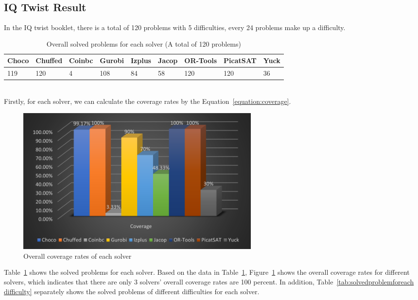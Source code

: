 \subsection{IQ Twist Result}
\label{sec:IQtwistresult}
In the IQ twist booklet, there is a total of 120 problems with 5 difficulties, every 24 problems make up a difficulty. 
\begin{table}[htbp]
\centering
\caption{Overall solved problems for each solver (A total of 120 problems)}
\label{tab:solvedproblem}
\begin{tabular}{|l|l|l|l|l|l|l|l|l|}
\hline
Choco & Chuffed & Coinbc& Gurobi & Izplus&Jacop& OR-Tools& PicatSAT&Yuck \\
\hline
119   &120      & 4     & 108    &84     &58   &120    &120      &36\\
\hline
\end{tabular}
\end{table}
\\Firstly, for each solver, we can calculate the coverage rates by the Equation~\ref{equation:coverage}.
\begin{figure}[H]
     \centering
    \includegraphics[width=0.6\textwidth]{figs/coverage.png}
    \caption{Overall coverage rates of each solver}
    \label{eva2}
\end{figure}
Table~\ref{tab:solvedproblem} shows the solved problems for each solver. Based on the data in Table~\ref{tab:solvedproblem},
Figure~\ref{eva2} shows the overall coverage rates for different solvers, which indicates that there are only 3 solvers' overall coverage rates are 100 percent.
In addition, Table~\ref{tab:solvedproblemforeach difficulty} separately shows the solved problems of different difficulties for each solver. 
